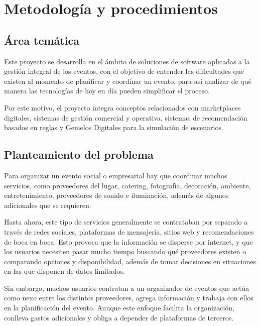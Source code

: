 
\chapter{Metodología y procedimientos}\label{cap:metodologia}

\section{Área temática}

Este proyecto se desarrolla en el ámbito de soluciones de software aplicadas a la gestión integral de los eventos, con el
objetivo de entender las dificultades que existen al momento de
planificar y coordinar un evento, para así analizar de qué manera las
tecnologías de hoy en día pueden simplificar el proceso.

Por este motivo, el proyecto integra conceptos relacionados con
marketplaces digitales, sistemas de gestión comercial y operativa,
sistemas de recomendación basados en reglas y Gemelos Digitales
para la simulación de escenarios.

\section{Planteamiento del problema}

Para organizar un evento social o empresarial hay que coordinar muchos
servicios, como proveedores del lugar, catering, fotografía, decoración,
ambiente, entretenimiento, proveedores de sonido e iluminación, además de
algunos adicionales que se requieren.

Hasta ahora, este tipo de servicios generalmente se contrataban por
separado a través de redes sociales, plataformas de mensajería, sitios web
y recomendaciones de boca en boca. Esto provoca que la información se
disperse por internet, y que los usuarios necesiten pasar mucho tiempo
buscando qué proveedores existen o comparando opciones y disponibilidad,
además de tomar decisiones en situaciones en las que disponen de datos
limitados.

Sin embargo, muchos usuarios contratan a un organizador de eventos que
actúa como nexo entre los distintos proveedores, agrega información y
trabaja con ellos en la planificación del evento. Aunque este enfoque
facilita la organización, conlleva gastos adicionales y obliga a depender
de plataformas de terceros.

